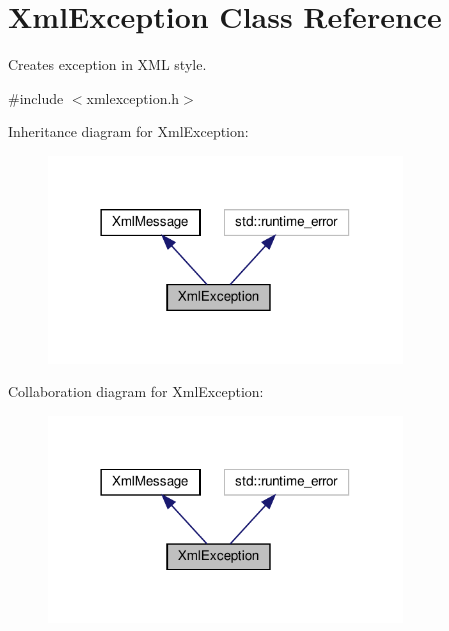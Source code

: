 \hypertarget{classXmlException}{}\section{Xml\+Exception Class Reference}
\label{classXmlException}


Creates exception in X\+ML style.  




{\ttfamily \#include $<$xmlexception.\+h$>$}



Inheritance diagram for Xml\+Exception\+:\nopagebreak
\begin{figure}[H]
\begin{center}
\leavevmode
\includegraphics[width=266pt]{dc/d4b/classXmlException__inherit__graph}
\end{center}
\end{figure}


Collaboration diagram for Xml\+Exception\+:\nopagebreak
\begin{figure}[H]
\begin{center}
\leavevmode
\includegraphics[width=266pt]{d7/dd4/classXmlException__coll__graph}
\end{center}
\end{figure}
